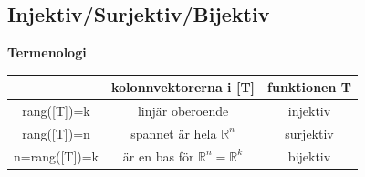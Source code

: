 \subsection{Injektiv/Surjektiv/Bijektiv}
\textbf{Termenologi}
\begin{center}
  \begin{tabular}{ | c | c | c | } 
    \hline
    [T]           & kolonnvektorerna i [T]                    & funktionen T \\
    \hline
    rang([T])=k   & linjär oberoende                          & injektiv \\ 
    rang([T])=n   & spannet är hela $\mathbb{R}^n$            & surjektiv \\
    n=rang([T])=k & är en bas för $\mathbb{R}^n=\mathbb{R}^k$ & bijektiv \\
    \hline
  \end{tabular} \\
\end{center}